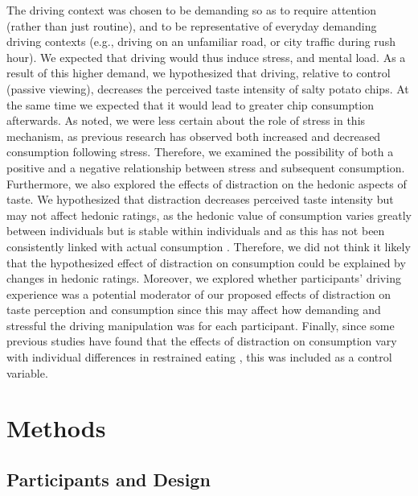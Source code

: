 \documentclass[authordate, empirical]{jote-new-article}
\begin{document}
The driving context was chosen to be demanding so as to require attention (rather than just routine), and to be representative of everyday demanding driving contexts (e.g., driving on an unfamiliar road, or city traffic during rush hour). We expected that driving would thus induce stress, and mental load. As a result of this higher demand, we hypothesized that driving, relative to control (passive viewing), decreases the perceived taste intensity of salty potato chips. At the same time we expected that it would lead to greater chip consumption afterwards. As noted, we were less certain about the role of stress in this mechanism, as previous research has observed both increased and decreased consumption following stress. Therefore, we examined the possibility of both a positive and a negative relationship between stress and subsequent consumption. Furthermore, we also explored the effects of distraction on the hedonic aspects of taste. We hypothesized that distraction decreases perceived taste intensity but may not affect hedonic ratings, as the hedonic value of consumption varies greatly between individuals but is stable within individuals and as this has not been consistently linked with actual consumption \parencites{DiFeliceantonio2018}{McCrickerd2016}{Tang2014}. Therefore, we did not think it likely that the hypothesized effect of distraction on consumption could be explained by changes in hedonic ratings. Moreover, we explored whether participants’ driving experience was a potential moderator of our proposed effects of distraction on taste perception and consumption since this may affect how demanding and stressful the driving manipulation was for each participant. Finally, since some previous studies have found that the effects of distraction on consumption vary with individual differences in restrained eating \parencites{Boon2002}{Ogden2013}, this was included as a control variable.







\section{Methods}



\subsection{Participants and Design}
\end{document}
